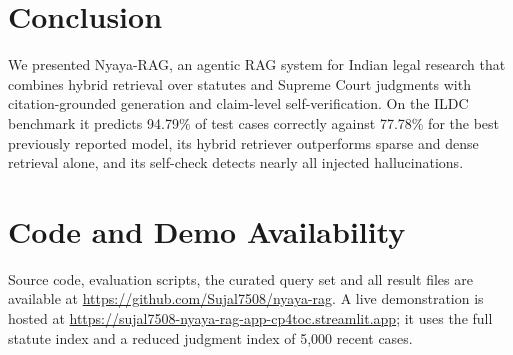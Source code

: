 \documentclass[conference]{IEEEtran}
\begin{document}
\section{Conclusion}
We presented Nyaya-RAG, an agentic RAG system for Indian legal research that combines hybrid retrieval over statutes and Supreme Court judgments with citation-grounded generation and claim-level self-verification. On the ILDC benchmark it predicts 94.79\% of test cases correctly against 77.78\% for the best previously reported model, its hybrid retriever outperforms sparse and dense retrieval alone, and its self-check detects nearly all injected hallucinations.

\section*{Code and Demo Availability}
Source code, evaluation scripts, the curated query set and all result files are available at \url{https://github.com/Sujal7508/nyaya-rag}. A live demonstration is hosted at \url{https://sujal7508-nyaya-rag-app-cp4toc.streamlit.app}; it uses the full statute index and a reduced judgment index of 5,000 recent cases.
\end{document}
